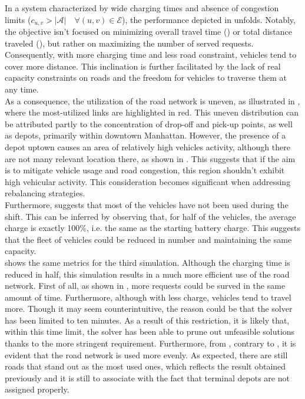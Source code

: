 In a system characterized by wide charging times and absence of congestion limits ($c_{u,v} > |\mathcal{A}| \quad \forall (u,v) \in \mathcal{E}$), the performance depicted in  unfolds. Notably, the objective isn't focused on minimizing overall travel time () or total distance traveled (), but rather on maximizing the number of served requests. Consequently, with more charging time and less road constraint, vehicles tend to cover more distance. This inclination is further facilitated by the lack of real capacity constraints on roads and the freedom for vehicles to traverse them at any time.\\
As a consequence, the utilization of the road network is uneven, as illustrated in , where the most-utilized links are highlighted in red. This uneven distribution can be attributed partly to the concentration of drop-off and pick-up points, as well as depots, primarily within downtown Manhattan. However, the presence of a depot uptown causes an area of relatively high vehicles activity, although there are not many relevant location there, as shown in . This suggests that if the aim is to mitigate vehicle usage and road congestion, this region shouldn't exhibit high vehicular activity. This consideration becomes significant when addressing rebalancing strategies.  \\
Furthermore,  suggests that most of the vehicles have not been used during the shift. This can be inferred by observing that, for half of the vehicles, the average charge is exactly 100\%, i.e. the same as the starting battery charge. This suggests that the fleet of vehicles could  be reduced in number and maintaining the same capacity. \\
 shows the same metrics for the third simulation. Although the charging time is reduced in half, this simulation results in a much more efficient use of the road network. First of all, as shown in , more requests could be surved in the same amount of time. Furthermore, although with less charge, vehicles tend to travel more. Though it may seem counterintuitive, the reason could be that the solver has been limited to ten minutes. As a result of this restriction, it is likely that, within this time limit, the solver has been able to prune out unfeasible solutions thanks to the more stringent requirement. Furthermore, from , contrary to , it is evident that the road network is used more evenly. As expected, there are still roads that stand out as the most used ones, which reflects the result obtained previously and it is still to associate with the fact that terminal depots are not assigned properly. 
